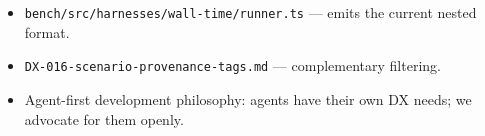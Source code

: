 \begin{itemize}
\tightlist
\item
  \texttt{b\allowbreak{}e\allowbreak{}n\allowbreak{}c\allowbreak{}h\allowbreak{}/\allowbreak{}s\allowbreak{}r\allowbreak{}c\allowbreak{}/\allowbreak{}h\allowbreak{}a\allowbreak{}r\allowbreak{}n\allowbreak{}e\allowbreak{}s\allowbreak{}s\allowbreak{}e\allowbreak{}s\allowbreak{}/\allowbreak{}w\allowbreak{}a\allowbreak{}l\allowbreak{}l\allowbreak{}-\allowbreak{}t\allowbreak{}i\allowbreak{}m\allowbreak{}e\allowbreak{}/\allowbreak{}r\allowbreak{}u\allowbreak{}n\allowbreak{}n\allowbreak{}e\allowbreak{}r\allowbreak{}.\allowbreak{}t\allowbreak{}s} --- emits the current nested format.
\item
  \texttt{D\allowbreak{}X\allowbreak{}-\allowbreak{}0\allowbreak{}1\allowbreak{}6\allowbreak{}-\allowbreak{}s\allowbreak{}c\allowbreak{}e\allowbreak{}n\allowbreak{}a\allowbreak{}r\allowbreak{}i\allowbreak{}o\allowbreak{}-\allowbreak{}p\allowbreak{}r\allowbreak{}o\allowbreak{}v\allowbreak{}e\allowbreak{}n\allowbreak{}a\allowbreak{}n\allowbreak{}c\allowbreak{}e\allowbreak{}-\allowbreak{}t\allowbreak{}a\allowbreak{}g\allowbreak{}s\allowbreak{}.\allowbreak{}m\allowbreak{}d} --- complementary filtering.
\item
  Agent-first development philosophy: agents have their own DX needs; we advocate for them openly.
\end{itemize}

